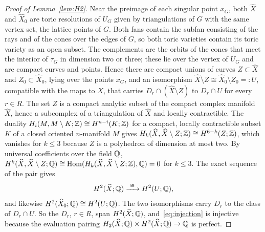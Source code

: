 \begin{proof}[Proof of Lemma~\ref{lem:H2}]
Near the preimage of each singular point $x_G$, both $\widehat X$ and $\widehat X_0$ are toric resolutions of $U_G$ given by
triangulations of $G$ with the same vertex set, the lattice points of $G$. Both fans contain the subfan consisting of the
rays and of the cones over the edges of $G$, so both toric varieties contain its toric variety as an open subset. The
complements are the orbits of the cones that meet the interior of $\tau_G$ in dimension two or three; these lie over the
vertex of $U_G$ and are compact curves and points. Hence there are compact unions of curves
$Z\subset\widehat X$ and $Z_0\subset\widehat X_0$, lying over the points $x_G$, and an isomorphism
$\widehat X\setminus Z\cong\widehat X_0\setminus Z_0=:U$, compatible with the maps to $X$, that carries $D_r\cap(\widehat X\setminus Z)$
to $D_r\cap U$ for every $r\in R$. The set $Z$ is a compact analytic subset of the compact complex manifold $\widehat X$,
hence a subcomplex of a triangulation of $\widehat X$ \cite[Thm.~2]{Loj64} and locally contractible. The duality
$H_i(M,M\setminus K;\mathbb Z)\cong H^{n-i}(K;\mathbb Z)$ for a compact, locally contractible subset $K$ of a closed oriented
$n$-manifold $M$ \cite[Thm.~3.44]{Hat02} gives $H_k(\widehat X,\widehat X\setminus Z;\mathbb Z)\cong H^{6-k}(Z;\mathbb Z)$, which
vanishes for $k\le3$ because $Z$ is a polyhedron of dimension at most two. By universal coefficients over the field $\mathbb Q$,
$H^k(\widehat X,\widehat X\setminus Z;\mathbb Q)\cong\operatorname{Hom}(H_k(\widehat X,\widehat X\setminus Z;\mathbb Z),\mathbb Q)=0$ for $k\le3$.
The exact sequence of the pair gives
\begin{equation}\label{eq:H2restr}
H^2(\widehat X;\mathbb Q)\xrightarrow{\ \cong\ }H^2(U;\mathbb Q),
\end{equation}
and likewise $H^2(\widehat X_0;\mathbb Q)\cong H^2(U;\mathbb Q)$. The two isomorphisms carry $D_r$ to the class of $D_r\cap U$. So the
$D_r$, $r\in R$, span $H^2(\widehat X;\mathbb Q)$, and~\eqref{eq:injection} is injective because the evaluation pairing
$H_2(\widehat X;\mathbb Q)\times H^2(\widehat X;\mathbb Q)\to\mathbb Q$ is perfect.
\end{proof}

